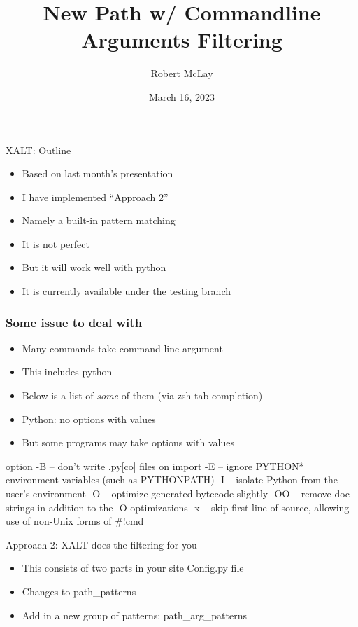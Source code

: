 \documentclass{beamer}
\begin{document}
\title[XALT]{New Path w/ Commandline Arguments Filtering}
\author{Robert McLay}
\date{March 16, 2023}

\frame{\titlepage}

\begin{frame}{XALT: Outline}
  \begin{itemize}
    \item Based on last month's presentation
    \item I have implemented ``Approach 2''
    \item Namely a built-in pattern matching
    \item It is not perfect
    \item But it will work well with python
    \item It is currently available under the testing branch
  \end{itemize}
\end{frame}

\begin{frame}[fragile]
    \frametitle{Some issue to deal with}
  \begin{itemize}
    \item Many commands take command line argument
    \item This includes python
    \item Below is a list of \emph{some} of them (via zsh tab completion)
    \item Python: no options with values
    \item But some programs may take options with values
  \end{itemize}
 {\tiny
    \begin{semiverbatim}
option
-B   -- don't write .py[co] files on import
-E   -- ignore PYTHON* environment variables (such as PYTHONPATH)
-I   -- isolate Python from the user's environment
-O   -- optimize generated bytecode slightly
-OO  -- remove doc-strings in addition to the -O optimizations
-x   -- skip first line of source, allowing use of non-Unix forms of #!cmd
    \end{semiverbatim}
}

\end{frame}

\begin{frame}{Approach 2: XALT does the filtering for you}
  \begin{itemize}
    \item This consists of two parts in your site Config.py file
    \item Changes to path\_patterns
    \item Add in a new group of patterns: path\_arg\_patterns
  \end{itemize}
\end{frame}
\end{document}
